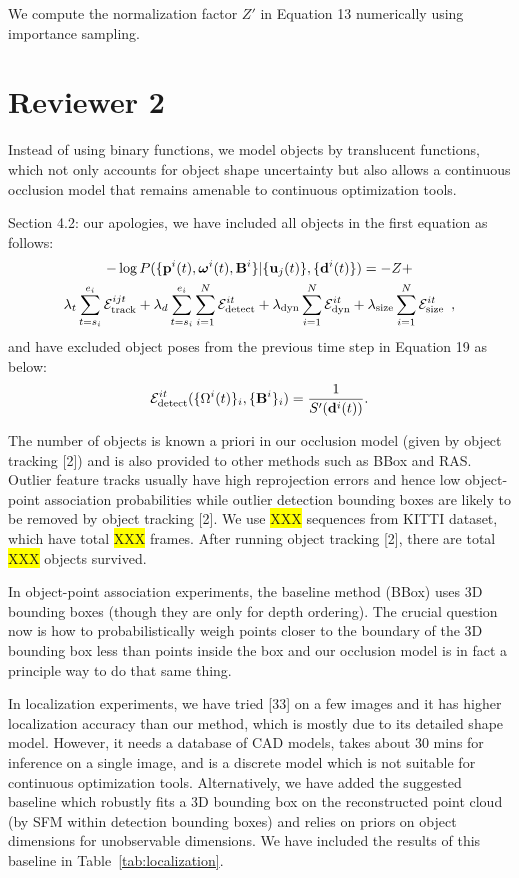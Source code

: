 \documentclass[10pt,twocolumn,letterpaper]{article}
\newcommand{\hili}[1]{\colorbox{yellow}{#1}}
\begin{document}
We compute the normalization factor $Z'$ in Equation 13 numerically using importance sampling.

\section{Reviewer 2}

Instead of using binary functions, we model objects by translucent functions, which not only accounts for object shape uncertainty but also allows a continuous occlusion model that remains amenable to continuous optimization tools. 

Section 4.2: our apologies, we have included all objects in the first equation as follows:
\begin{multline*}
  -\log{P(\{ \mathbf{p}^i(t) , \bm{\omega}^i(t) , \mathbf{B}^i \} | \{\mathbf{u}_j(t)\} , \{\mathbf{d}^{i}(t)\} )} = -Z + \\ 
  \lambda_t \sum_{t=s_i}^{e_i} \mathcal{E}^{ijt}_{\text{track}}
  + 
  \lambda_d \sum_{t=s_i}^{e_i} \sum_{i=1}^N \mathcal{E}^{it}_{\text{detect}}
  + 
  \lambda_{\text{dyn}} \sum_{i=1}^N \mathcal{E}^{it}_{\text{dyn}}
  + 
  \lambda_{\text{size}} \sum_{i=1}^N \mathcal{E}^{it}_{\text{size}}
  \enspace,
\end{multline*}
and have excluded object poses from the previous time step in Equation 19 as below:
\begin{align*}
\mathcal{E}^{it}_{\text{detect}}(\{ \Omega^{i}(t) \}_i, \{\mathbf{B}^{i}\}_i ) = \frac{1}{S'(\mathbf{d}^{i}(t))}.
\end{align*}

The number of objects is known a priori in our occlusion model (given by object tracking [2]) and is also provided to other methods such as BBox and RAS. Outlier feature tracks usually have high reprojection errors and hence low object-point association probabilities while outlier detection bounding boxes are likely to be removed by object tracking [2]. We use \hili{XXX} sequences from KITTI dataset, which have total \hili{XXX} frames. After running object tracking [2], there are total \hili{XXX} objects survived.

In object-point association experiments, the baseline method (BBox) uses 3D bounding boxes (though they are only for depth ordering). The crucial question now is how to probabilistically weigh points closer to the boundary of the 3D bounding box less than points inside the box and our occlusion model is in fact a principle way to do that same thing.

In localization experiments, we have tried [33] on a few images and it has higher localization accuracy than our method, which is mostly due to its detailed shape model. However, it needs a database of CAD models, takes about 30 mins for inference on a single image, and is a discrete model which is not suitable for continuous optimization tools. Alternatively, we have added the suggested baseline which robustly fits a 3D bounding box on the reconstructed point cloud (by SFM within detection bounding boxes) and relies on priors on object dimensions for unobservable dimensions. We have included the results of this baseline in Table~\ref{tab:localization}.
\end{document}
